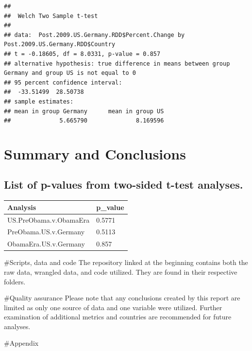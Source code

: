 \documentclass[
  12pt,
]{article}
\begin{document}
\begin{verbatim}
## 
##  Welch Two Sample t-test
## 
## data:  Post.2009.US.Germany.RDD$Percent.Change by Post.2009.US.Germany.RDD$Country
## t = -0.18605, df = 8.0331, p-value = 0.857
## alternative hypothesis: true difference in means between group Germany and group US is not equal to 0
## 95 percent confidence interval:
##  -33.51499  28.50738
## sample estimates:
## mean in group Germany      mean in group US 
##              5.665790              8.169596
\end{verbatim}

\newpage

\hypertarget{summary-and-conclusions}{%
\section{Summary and Conclusions}\label{summary-and-conclusions}}

\hypertarget{list-of-p-values-from-two-sided-t-test-analyses.}{%
\subsection{List of p-values from two-sided t-test
analyses.}\label{list-of-p-values-from-two-sided-t-test-analyses.}}

\begin{longtable}[]{@{}ll@{}}
\toprule()
Analysis & p\_value \\
\midrule()
\endhead
US.PreObama.v.ObamaEra & 0.5771 \\
PreObama.US.v.Germany & 0.5113 \\
ObamaEra.US.v.Germany & 0.857 \\
\bottomrule()
\end{longtable}

\newpage

\#Scripts, data and code The repository linked at the beginning contains
both the raw data, wrangled data, and code utilized. They are found in
their respective folders.

\#Quality assurance Please note that any conclusions created by this
report are limited as only one source of data and one variable were
utilized. Further examination of additional metrics and countries are
recommended for future analyses.

\newpage

\#Appendix
\end{document}
